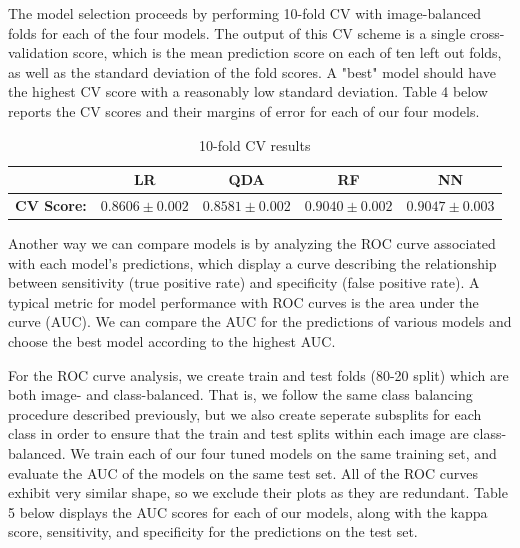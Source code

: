 \documentclass{article}\usepackage[]{graphicx}\usepackage[]{color}
\begin{document}
The model selection proceeds by performing 10-fold CV with image-balanced folds for each of the four models. The output of this CV scheme is a single cross-validation score, which is the mean prediction score on each of ten left out folds, as well as the standard deviation of the fold scores. A "best" model should have the highest CV score with a reasonably low standard deviation. 
Table 4 below reports the CV scores and their margins of error for each of our four models.

\begin{table}[h!]
\centering
\caption{10-fold CV results}
\label{my-label}
\begin{tabular}{|c|c|c|c|c|}
\hline
                   & \textbf{LR}        & \textbf{QDA}       & \textbf{RF}        & \textbf{NN}                 \\ \hline
\textbf{CV Score:} & $0.8606 \pm 0.002$ & $0.8581 \pm 0.002$ & $0.9040 \pm 0.002$ & $\mathbf{0.9047 \pm 0.003}$ \\ \hline
\end{tabular}
\end{table}

Another way we can compare models is by analyzing the ROC curve associated with each
model's predictions, which display a curve describing the relationship between
sensitivity (true positive rate) and specificity (false positive rate). A typical
metric for model performance with ROC curves is the area under the curve (AUC).
We can compare the AUC for the predictions of various models and choose the best
model according to the highest AUC.

For the ROC curve analysis, we create train and test folds (80-20 split) which are both
image- and class-balanced. That is, we follow the same class balancing procedure described
previously, but we also create seperate subsplits for each class in order to ensure
that the train and test splits within each image are class-balanced. We train each of
our four tuned models on the same training set, and evaluate the AUC of the models on 
the same test set. All of the ROC curves exhibit very similar shape, so we exclude their plots
as they are redundant. Table 5 below displays the AUC scores for each of our models, along with the kappa score, sensitivity, and specificity for the predictions on the test set.
\end{document}
